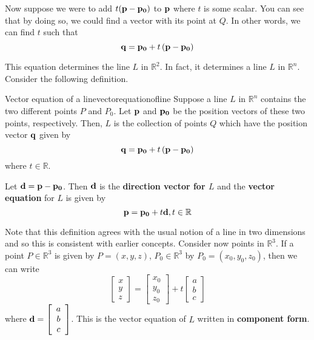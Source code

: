 Now suppose we were to add $t({\bf p} - {\bf p_0})$ to ${\bf p}$ where $t$ is some scalar.
You can see that by doing so, we could find a vector with its point at $Q$. In other words, we can find $t$ such that 
\begin{equation*}
{\bf q} = {\bf p_0} + t \left( {\bf p}- {\bf p_0}\right)
\end{equation*}

This equation determines the line $L$ in $\mathbb{R}^2$. In fact, it determines a line $L$ in $\mathbb{R}^n$. Consider the following definition.

\begin{definition}{Vector equation of a line}{vectorequationofline}
Suppose a line $L$ in $\mathbb{R}^{n}$ contains the two different points $P$ and 
$P_0$. Let ${\bf p}$ and ${\bf p_0}$ be the position vectors of these two points, respectively.
Then, $L$ is the collection of points $Q$ which have the position vector ${\bf q}$ given by
\begin{equation*}
{\bf q}={\bf p_0}+t\left( {\bf p}-{\bf p_0}\right)
\end{equation*}
where $t\in \mathbb{R}$. 

Let ${\bf d} = {\bf p} - {\bf p_0}$. Then ${\bf d}$ is the \textbf{direction vector for $L$} and the \textbf{vector equation} for $L$ is given by 
\begin{equation*}
{\bf p}={\bf p_0}+t{\bf d}, t\in\mathbb{R}
\end{equation*}
\end{definition}

Note that this definition agrees with the usual notion of a
line in two dimensions and so this is consistent with earlier concepts. Consider now points in $\mathbb{R}^3$. If a point $P \in \mathbb{R}^3$ is given by $P = \left( x,y,z \right)$, $P_0 \in \mathbb{R}^3$ by $P_0 = \left( x_0, y_0, z_0 \right)$, then we can write
\begin{equation*}
\left[
\begin{array}{c}
x \\
y \\
z 
\end{array}
\right] = 
\left[
\begin{array}{c}
x_0 \\
y_0 \\
z_0 
\end{array}
\right]
+
t
\left[
\begin{array}{c}
a \\
b \\
c 
\end{array}
\right]
\end{equation*}
where ${\bf d} = \left[
\begin{array}{c}
a \\
b \\
c 
\end{array}
\right]$. This is the vector equation of $L$ written in \textbf{component form}.

